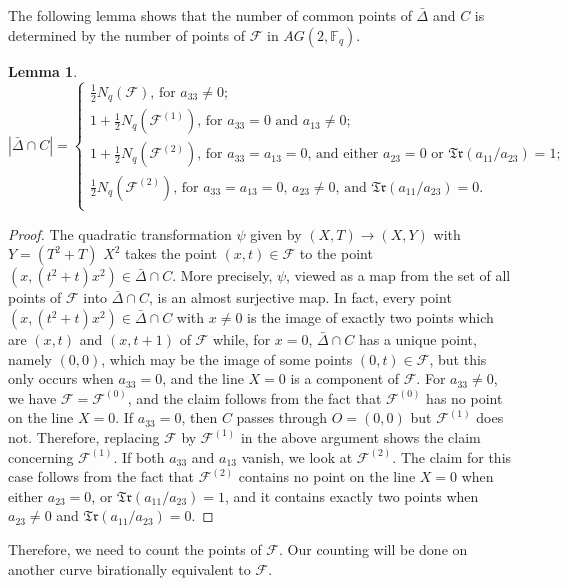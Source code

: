 \documentclass[sn-mathphys-num]{sn-jnl}%
\newtheorem{lemma}{Lemma}%
\begin{document}
The following lemma shows that the number of common points of $\bar{\Delta}$ and $C$ is determined by the number of points of $\mathcal{F}$ in $AG(2,\mathbb{F}_q)$. 
\begin{lemma}
\label{lem27102025}
$$|\bar{\Delta}\cap C|=
\begin{cases}
{\mbox{$\textstyle{\frac{1}{2}}N_q(\mathcal{F})$, for $a_{33}\ne 0$;}}\\
{\mbox{$1+\textstyle{\frac{1}{2}}N_q(\mathcal{F}^{(1)})$, for $a_{33}=0$ and $a_{13}\ne 0$;}}\\
{\mbox{$1+\textstyle{\frac{1}{2}}N_q(\mathcal{F}^{(2)})$, for $a_{33}=a_{13}=0$, and either $a_{23}=0$ or $\mathfrak{Tr}(a_{11}/a_{23})=1;$}}\\
{\mbox{$\textstyle{\frac{1}{2}}N_q(\mathcal{F}^{(2)})$, for $a_{33}=a_{13}=0$, $a_{23}\ne 0$, and $\mathfrak{Tr}(a_{11}/a_{23})=0.$}}\\
\end{cases}
$$
\end{lemma}
\begin{proof} The quadratic transformation $\psi$ given by $(X,T)\to (X,Y)$  with $Y=(T^2+T)$ $X^2$
takes the point $(x,t)\in \mathcal F$ to the point
$(x,(t^2+t)x^2)\in \bar{\Delta}\cap C$. More precisely, $\psi$, viewed as a map from the set of all points of $\mathcal{F}$ into $\bar{\Delta}\cap C$, is an almost surjective map. In fact,  every point $(x,(t^2+t)x^2)\in \bar{\Delta}\cap C$ with $x\ne 0$ is the image of exactly two points which are $(x,t)$ and $(x,t+1)$ of $\mathcal{F}$ while, for $x=0$, $\bar{\Delta}\cap C$ has a unique point, namely $(0,0)$, which may be the image of some points $(0,t)\in \mathcal{F}$, but this only occurs when $a_{33}=0$, and the line $X=0$ is a component of $\mathcal{F}$. For $a_{33}\ne 0$, we have $\mathcal{F}=\mathcal{F}^{(0)}$, and the claim follows from the fact that $\mathcal{F}^{(0)}$ has no point on the line $X=0$. If $a_{33}=0$, then $C$ passes through $O=(0,0)$ but $\mathcal{F}^{(1)}$ does not. Therefore, replacing $\mathcal F$ by $\mathcal{F}^{(1)}$ in the above argument shows the claim concerning $\mathcal{F}^{(1)}$. If both $a_{33}$ and $a_{13}$ vanish, we look at $\mathcal{F}^{(2)}$. The claim for this case follows from the fact that  $\mathcal{F}^{(2)}$ contains no point on the line $X=0$ when either $a_{23}=0$, or $\mathfrak{Tr}(a_{11}/a_{23})=1$, and it contains exactly two points when $a_{23} \ne 0$ and  $\mathfrak{Tr}(a_{11}/a_{23})=0$.
\end{proof}

Therefore, we need to count the points of $\mathcal{F}$. Our counting will be done on another curve birationally equivalent to $\mathcal{F}$.
\end{document}
